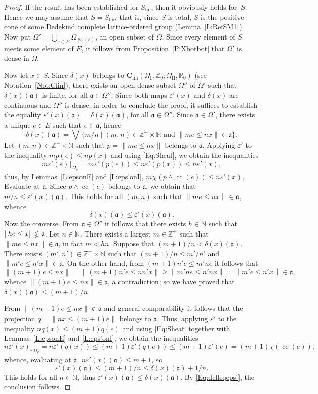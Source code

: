 \documentclass[psamsfonts,reqno]{memo-l}
\theoremstyle{plain}
\theoremstyle{definition}
\theoremstyle{remark}
\numberwithin{equation}{section}
\newcommand{\eps}{\varepsilon}
\newcommand{\CC}{\mathbf{C}}
\newcommand{\fa}{\mathfrak{a}}
\newcommand{\fin}{\mathrm{fin}}
\newcommand{\bv}[1]{\left\|#1\right\|}
\newcommand{\I}{\mathrm{I}}
\newcommand{\II}{\mathrm{II}}
\newcommand{\NN}{\mathbb{N}}
\newcommand{\ZZ}{\mathbb{Z}}
\newcommand{\RR}{\mathbb{R}}
\DeclareMathOperator{\cc}{cc}
\newcommand{\set}[1]{\{#1\}}
\newcommand{\setm}[2]{\set{#1\mid#2}}
\begin{document}
\begin{proof}
If the result has been established for $S_\fin$, then it obviously holds
for~$S$. Hence we may assume that $S=S_\fin$, that is, since $S$ is total, $S$
is the positive cone of some Dedekind complete lattice-ordered group
(Lemma~\ref{L:RefSM1}). Now put
$\Omega'=\bigcup_{e\in E}\Omega_{\cc(e)}$, an open subset of $\Omega$. Since
every element of $S$ meets some element of $E$, it follows from
Proposition~\ref{P:Xbotbot} that $\Omega'$ is dense in $\Omega$.

Now let $x\in S$. Since $\delta(x)$ belongs to
$\CC_{\fin}(\Omega_{\I},\ZZ_0;\Omega_{\II},\RR_0)$ (see
Notation~\ref{Not:Cfin}), there exists an open dense subset $\Omega''$ of
$\Omega'$ such that $\delta(x)(\fa)$ is finite, for all $\fa\in\Omega''$.
Since both maps $\eps'(x)$ and $\delta(x)$ are continuous and $\Omega''$ is
dense, in order to conclude the proof, it suffices to establish the equality
$\eps'(x)(\fa)=\delta(x)(\fa)$, for all $\fa\in\Omega''$. Since
$\fa\in\Omega'$, there exists a unique $e\in E$ such that $e\in\fa$, hence
   \[
   \delta(x)(\fa)=\bigvee\setm{m/n}
   {(m,n)\in\ZZ^+\times\NN\text{ and }\bv{me\leq nx}\in\fa}.
   \]
Let $(m,n)\in\ZZ^+\times\NN$ such that $p=\bv{me\leq nx}$ belongs to $\fa$.
Applying $\eps'$ to the inequality $mp(e)\leq np(x)$ and using
\eqref{Eq:Sheaf}, we obtain the inequalities
   \[
   m\eps'(e)\rfloor_{\Omega_p}=m\eps'(p(e))\leq n\eps'(p(x))\leq n\eps'(x),
   \]
thus, by Lemmas~\ref{L:epsonE} and \ref{L:eps'onI},
$m\chi(p\wedge\cc(e))\leq n\eps'(x)$. Evaluate at $\fa$. Since
$p\wedge\cc(e)$ belongs to $\fa$, we obtain that $m/n\leq\eps'(x)(\fa)$. This
holds for all $(m,n)$ such that $\bv{me\leq nx}\in\fa$, whence
   \begin{equation}\label{Eq:delleqeps'}
   \delta(x)(\fa)\leq\eps'(x)(\fa).
   \end{equation}
Now the converse. {}From $\fa\in\Omega''$ it follows that there exists
$h\in\NN$ such that $\bv{he\leq x}\notin\nobreak\fa$. Let $n\in\NN$. There
exists a largest $m\in\ZZ^+$ such that $\bv{me\leq nx}\in\fa$, in fact $m<hn$.
Suppose that $(m+1)/n<\delta(x)(\fa)$. There exists
$(m',n')\in\ZZ^+\times\NN$ such that $(m+1)/n\leq m'/n'$ and $\bv{m'e\leq
n'x}\in\fa$. On the other hand, from $(m+1)n'e\leq m'ne$ it follows that
   \[
   \bv{(m+1)e\leq nx}=\bv{(m+1)n'e\leq nn'x}\geq\bv{m'ne\leq n'nx}
   =\bv{m'e\leq n'x}\in\fa,
   \]
whence $\bv{(m+1)e\leq nx}\in\fa$, a contradiction; so we have proved that
$\delta(x)(\fa)\leq(m+1)/n$.

{}From $\bv{(m+1)e\leq nx}\notin\fa$ and general comparability it follows that
the projection $q=\bv{nx\leq(m+1)e}$ belongs to $\fa$. Thus, applying $\eps'$
to the inequality $nq(x)\leq(m+1)q(e)$ and using \eqref{Eq:Sheaf} together
with Lemmas~\ref{L:epsonE} and \ref{L:eps'onI}, we obtain the inequalities
   \[
n\eps'(x)\rfloor_{\Omega_q}=n\eps'(q(x))\leq(m+1)\eps'(q(e))
\leq(m+1)\eps'(e)=(m+1)\chi(\cc(e)),
   \]
whence, evaluating at $\fa$, $n\eps'(x)(\fa)\leq m+1$, so
   \[
   \eps'(x)(\fa)\leq(m+1)/n\leq\delta(x)(\fa)+1/n.
   \]
This holds for all $n\in\NN$, thus $\eps'(x)(\fa)\leq\delta(x)(\fa)$.
By \eqref{Eq:delleqeps'}, the conclusion follows.
\end{proof}
\end{document}
